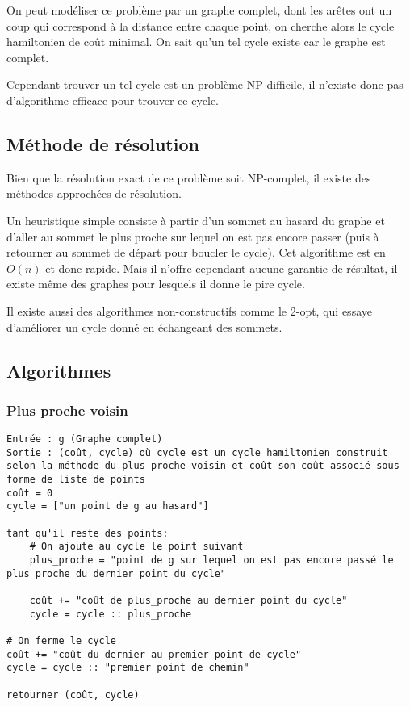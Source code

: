 \documentclass{scrartcl}
\begin{document}
    On peut modéliser ce problème par un graphe complet, dont les arêtes ont un
    coup qui correspond à la distance entre chaque point, on cherche alors le
    cycle hamiltonien de coût minimal. On sait qu'un tel cycle existe car le
    graphe est complet.

    Cependant trouver un tel cycle est un problème NP-difficile, il n'existe
    donc pas d'algorithme efficace pour trouver ce cycle.

  \subsection{Méthode de résolution}
    Bien que la résolution exact de ce problème soit NP-complet, il existe des
    méthodes approchées de résolution.

    Un heuristique simple consiste à partir d'un sommet au hasard du graphe et
    d'aller au sommet le plus proche sur lequel on est pas encore passer (puis
    à retourner au sommet de départ pour boucler le cycle). Cet algorithme est
    en $O(n)$ et donc rapide. Mais il n'offre cependant aucune garantie de
    résultat, il existe même des graphes pour lesquels il donne le pire cycle.

    Il existe aussi des algorithmes non-constructifs comme le 2-opt, qui essaye
    d'améliorer un cycle donné en échangeant des sommets.


  \subsection{Algorithmes}
    \subsubsection{Plus proche voisin}
      \begin{lstlisting}
Entrée : g (Graphe complet)
Sortie : (coût, cycle) où cycle est un cycle hamiltonien construit selon la méthode du plus proche voisin et coût son coût associé sous forme de liste de points
coût = 0
cycle = ["un point de g au hasard"]

tant qu'il reste des points:
    # On ajoute au cycle le point suivant
    plus_proche = "point de g sur lequel on est pas encore passé le plus proche du dernier point du cycle"

    coût += "coût de plus_proche au dernier point du cycle"
    cycle = cycle :: plus_proche

# On ferme le cycle
coût += "coût du dernier au premier point de cycle"
cycle = cycle :: "premier point de chemin"

retourner (coût, cycle)
      \end{lstlisting}
\end{document}
